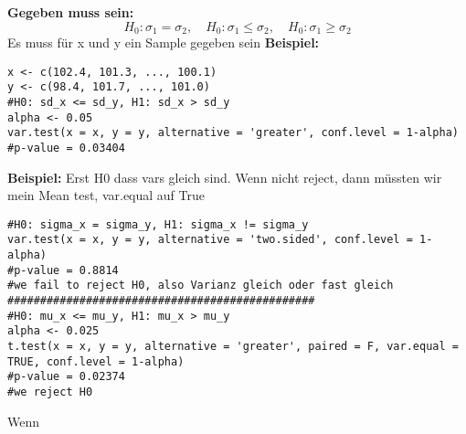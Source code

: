 \large{\textbf{Gegeben muss sein:}}
\[
H_0: \sigma_1 = \sigma_2, \quad 
H_0: \sigma_1 \leq \sigma_2, \quad 
H_0: \sigma_1 \geq \sigma_2
\]
\textcolor{red}{\warning} Es muss für x und y ein Sample gegeben sein \textcolor{red}{\warning}
\large{\textbf{Beispiel:}}
\begin{lstlisting}
x <- c(102.4, 101.3, ..., 100.1)
y <- c(98.4, 101.7, ..., 101.0)
#H0: sd_x <= sd_y, H1: sd_x > sd_y
alpha <- 0.05
var.test(x = x, y = y, alternative = 'greater', conf.level = 1-alpha)
#p-value = 0.03404
\end{lstlisting}

\large{\textbf{Beispiel:}}
\normalsize
Erst H0 dass vars gleich sind. Wenn nicht reject, dann müssten wir mein Mean test, var.equal auf True
\begin{lstlisting}
#H0: sigma_x = sigma_y, H1: sigma_x != sigma_y
var.test(x = x, y = y, alternative = 'two.sided', conf.level = 1-alpha)
#p-value = 0.8814
#we fail to reject H0, also Varianz gleich oder fast gleich
###############################################
#H0: mu_x <= mu_y, H1: mu_x > mu_y
alpha <- 0.025
t.test(x = x, y = y, alternative = 'greater', paired = F, var.equal = TRUE, conf.level = 1-alpha)
#p-value = 0.02374
#we reject H0
\end{lstlisting}
Wenn 
